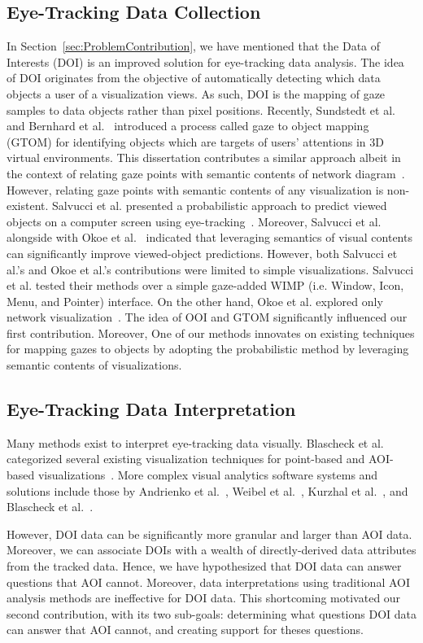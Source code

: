 \subsection{Eye-Tracking Data Collection} 
In Section~\ref{sec:ProblemContribution}, we have mentioned that the Data of Interests (DOI) is an improved solution for eye-tracking data analysis. The idea of DOI originates from the objective of automatically detecting which data objects a user of a visualization views. As such, DOI is the mapping of gaze samples to data objects rather than pixel positions. Recently, Sundstedt et al.~\cite{Sun13} and Bernhard et al.~\cite{Bern14} introduced a process called gaze to object mapping (GTOM) for identifying objects which are targets of users' attentions in 3D virtual environments. This dissertation contributes a similar approach albeit in the context of relating gaze points with semantic contents of network diagram~\cite{Okoe14}. However, relating gaze points with semantic contents of any visualization is non-existent. Salvucci et al. presented a probabilistic approach to predict viewed objects on a computer screen using eye-tracking~\cite{Sal00}. Moreover, Salvucci et al. alongside with Okoe et al.~\cite{Okoe14} indicated that leveraging semantics of visual contents can significantly improve viewed-object predictions. However, both Salvucci et al.'s and Okoe et al.'s contributions were limited to simple visualizations. Salvucci et al. tested their methods over a simple gaze-added WIMP (i.e. Window, Icon, Menu, and Pointer) interface. On the other hand, Okoe et al. explored only network visualization~\cite{Okoe14}. The idea of OOI and GTOM significantly influenced our first contribution. Moreover, One of our methods innovates on existing techniques for mapping gazes to objects by adopting the probabilistic method by leveraging semantic contents of visualizations.  


\subsection{Eye-Tracking Data Interpretation}
Many methods exist to interpret eye-tracking data visually. Blascheck et al. categorized several existing visualization techniques for point-based and AOI-based visualizations~\cite{Bla14}. More complex visual analytics software systems and solutions include those by Andrienko et al.~\cite{And12}, Weibel et al.~\cite{Wei12}, Kurzhal et al.~\cite{Kur14}, and Blascheck et al.~\cite{Bla16}.

However, DOI data can be significantly more granular and larger than AOI data. Moreover, we can associate DOIs with a wealth of directly-derived data attributes from the tracked data. Hence, we have hypothesized that DOI data can answer questions that AOI cannot. Moreover, data interpretations using traditional AOI analysis methods are ineffective for DOI data. This shortcoming motivated our second contribution, with its two sub-goals: determining what questions DOI data can answer that AOI cannot, and creating support for theses questions. 
 

